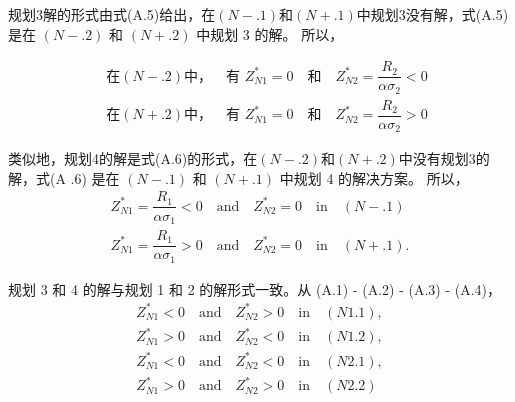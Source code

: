 \documentclass[10.0pt]{article}
\begin{document}
规划3解的形式由式(A.5)给出，在$(N-.1)$和$(N+.1)$中规划3没有解，式(A.5) 是在 $ (N-.2) $ 和 $ (N+.2) $ 中规划 3 的解。 所以，

\begin{eqnarray*}
&\quad  \text{在}  (N-.2) \text{中，}\quad \text{有  } Z_{N1}^* = 0  \quad \text{和} \quad Z_{N2}^* = \dfrac{R_2}{\alpha \sigma_2} < 0  & \\
&\quad  \text{在}  (N+.2) \text{中，}\quad \text{有  } Z_{N1}^* = 0 \quad \text{和} \quad Z_{N2}^* = \dfrac{R_2}{\alpha \sigma_2} > 0    &
\end{eqnarray*}


类似地，规划4的解是式(A.6)的形式，在$(N-.2)$和$(N+.2)$中没有规划3的解，式(A .6) 是在 $ (N-.1) $ 和 $ (N+.1) $ 中规划 4 的解决方案。 所以，
\begin{eqnarray*}
& Z_{N1}^* = \dfrac{R_1}{\alpha \sigma_1} < 0 \quad \text{and} \quad Z_{N2}^* = 0 \quad \text{in} \quad (N-.1) & \\
& Z_{N1}^* = \dfrac{R_1}{\alpha \sigma_1} > 0 \quad \text{and} \quad Z_{N2}^* = 0 \quad \text{in} \quad (N+.1). &
\end{eqnarray*}

规划 3 和 4 的解与规划 1 和 2 的解形式一致。从 (A.1) - (A.2) - (A.3) - (A.4)，
\begin{eqnarray*}
& Z_{N1}^* < 0 \quad \text{and} \quad Z_{N2}^* > 0 \quad \text{in} \quad (N1.1), & \\
& Z_{N1}^* > 0 \quad \text{and} \quad Z_{N2}^* < 0 \quad \text{in} \quad (N1.2), & \\
& Z_{N1}^* < 0 \quad \text{and} \quad Z_{N2}^* < 0 \quad \text{in} \quad (N2.1), & \\
& Z_{N1}^* > 0 \quad \text{and} \quad Z_{N2}^* > 0 \quad \text{in} \quad (N2.2) & 
\end{eqnarray*}
\end{document}

